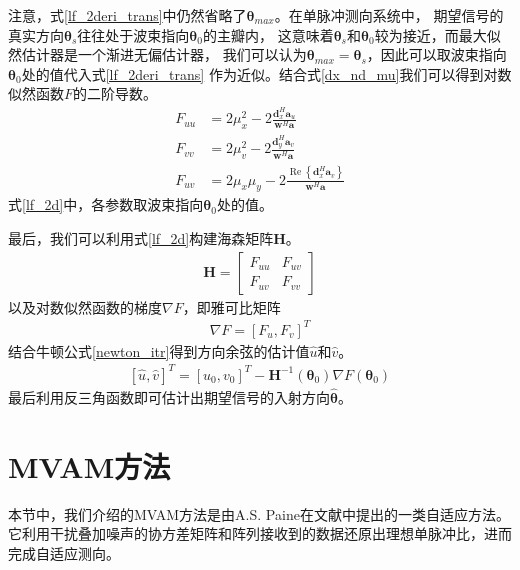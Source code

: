 \documentclass[master]{thesis-uestc}
\begin{document}
注意，式\eqref{lf_2deri_trans}中仍然省略了$\bm{\theta}_{max}$。在单脉冲测向系统中，
期望信号的真实方向$\bm{\theta}_s$往往处于波束指向$\bm{\theta}_0$的主瓣内，
这意味着$\bm{\theta}_s$和$\bm{\theta}_0$较为接近，而最大似然估计器是一个渐进无偏估计器，
我们可以认为$\bm{\theta}_{max}=\bm{\theta}_s$，因此可以取波束指向$\bm{\theta}_0$处的值代入式\eqref{lf_2deri_trans}
作为近似。结合式\eqref{dx_nd_mu}我们可以得到对数似然函数$F$的二阶导数。
\begin{subequations}\label{lf_2d}
    \begin{align}
        F_{uu} &= 2\mu^2_x - 2\frac{\bm{d}^H_x\bm{a}_u}{\bm{w}^H\bm{a}} \\
        F_{vv} &= 2\mu^2_v - 2\frac{\bm{d}^H_y\bm{a}_v}{\bm{w}^H\bm{a}} \\
        F_{uv} &= 2\mu_x\mu_y - 2\frac{\operatorname{Re}\left\{\bm{d}^H_x\bm{a}_v\right\}}{\bm{w}^H\bm{a}}
    \end{align}
\end{subequations}
式\eqref{lf_2d}中，各参数取波束指向$\bm{\theta}_0$处的值。

最后，我们可以利用式\eqref{lf_2d}构建海森矩阵$\bm{H}$。
\begin{equation}\label{hessian_mat}
    \begin{aligned}
        \bm{H} = 
        \begin{bmatrix}
            F_{uu} & F_{uv} \\
            F_{uv} & F_{vv}
        \end{bmatrix}
    \end{aligned}
\end{equation}
以及对数似然函数的梯度$\nabla F$，即雅可比矩阵
\begin{equation}\label{jacobian_mat}
    \begin{aligned}
        \nabla F = \left[F_{u},F_{v}\right]^T
    \end{aligned}
\end{equation}
结合牛顿公式\eqref{newton_itr}得到方向余弦的估计值$\hat{u}$和$\hat{v}$。
\begin{equation}
    \begin{aligned}
        \left[\hat{u},\hat{v}\right]^T = \left[u_0, v_0\right]^T - \bm{H}^{-1}(\bm{\theta}_0)\nabla F(\bm{\theta}_0)
    \end{aligned}
\end{equation}
最后利用反三角函数即可估计出期望信号的入射方向$\hat{\bm{\theta}}$。

\section{MVAM方法}
本节中，我们介绍的MVAM方法是由A.S. Paine在文献\cite{Paine}中提出的一类自适应方法。
它利用干扰叠加噪声的协方差矩阵和阵列接收到的数据还原出理想单脉冲比，进而完成自适应测向。
\end{document}
